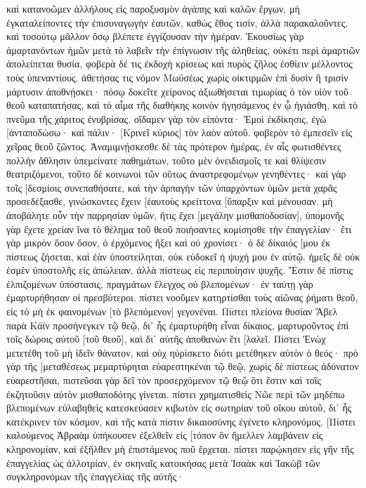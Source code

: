 καὶ κατανοῶμεν ἀλλήλους εἰς παροξυσμὸν ἀγάπης καὶ καλῶν ἔργων, 
μὴ ἐγκαταλείποντες τὴν ἐπισυναγωγὴν ἑαυτῶν, καθὼς ἔθος τισίν, ἀλλὰ παρακαλοῦντες, καὶ τοσούτῳ μᾶλλον ὅσῳ βλέπετε ἐγγίζουσαν τὴν ἡμέραν. 
Ἑκουσίως γὰρ ἁμαρτανόντων ἡμῶν μετὰ τὸ λαβεῖν τὴν ἐπίγνωσιν τῆς ἀληθείας, οὐκέτι περὶ ἁμαρτιῶν ἀπολείπεται θυσία, 
φοβερὰ δέ τις ἐκδοχὴ κρίσεως καὶ πυρὸς ζῆλος ἐσθίειν μέλλοντος τοὺς ὑπεναντίους. 
ἀθετήσας τις νόμον Μωϋσέως χωρὶς οἰκτιρμῶν ἐπὶ δυσὶν ἢ τρισὶν μάρτυσιν ἀποθνῄσκει· 
πόσῳ δοκεῖτε χείρονος ἀξιωθήσεται τιμωρίας ὁ τὸν υἱὸν τοῦ θεοῦ καταπατήσας, καὶ τὸ αἷμα τῆς διαθήκης κοινὸν ἡγησάμενος ἐν ᾧ ἡγιάσθη, καὶ τὸ πνεῦμα τῆς χάριτος ἐνυβρίσας. 
οἴδαμεν γὰρ τὸν εἰπόντα· Ἐμοὶ ἐκδίκησις, ἐγὼ [ἀνταποδώσω· καὶ πάλιν· [Κρινεῖ κύριος] τὸν λαὸν αὐτοῦ. 
φοβερὸν τὸ ἐμπεσεῖν εἰς χεῖρας θεοῦ ζῶντος. 
Ἀναμιμνῄσκεσθε δὲ τὰς πρότερον ἡμέρας, ἐν αἷς φωτισθέντες πολλὴν ἄθλησιν ὑπεμείνατε παθημάτων, 
τοῦτο μὲν ὀνειδισμοῖς τε καὶ θλίψεσιν θεατριζόμενοι, τοῦτο δὲ κοινωνοὶ τῶν οὕτως ἀναστρεφομένων γενηθέντες· 
καὶ γὰρ τοῖς [δεσμίοις συνεπαθήσατε, καὶ τὴν ἁρπαγὴν τῶν ὑπαρχόντων ὑμῶν μετὰ χαρᾶς προσεδέξασθε, γινώσκοντες ἔχειν [ἑαυτοὺς κρείττονα [ὕπαρξιν καὶ μένουσαν. 
μὴ ἀποβάλητε οὖν τὴν παρρησίαν ὑμῶν, ἥτις ἔχει [μεγάλην μισθαποδοσίαν], 
ὑπομονῆς γὰρ ἔχετε χρείαν ἵνα τὸ θέλημα τοῦ θεοῦ ποιήσαντες κομίσησθε τὴν ἐπαγγελίαν· 
ἔτι γὰρ μικρὸν ὅσον ὅσον, ὁ ἐρχόμενος ἥξει καὶ οὐ χρονίσει· 
ὁ δὲ δίκαιός [μου ἐκ πίστεως ζήσεται, καὶ ἐὰν ὑποστείληται, οὐκ εὐδοκεῖ ἡ ψυχή μου ἐν αὐτῷ. 
ἡμεῖς δὲ οὐκ ἐσμὲν ὑποστολῆς εἰς ἀπώλειαν, ἀλλὰ πίστεως εἰς περιποίησιν ψυχῆς. 
Ἔστιν δὲ πίστις ἐλπιζομένων ὑπόστασις, πραγμάτων ἔλεγχος οὐ βλεπομένων· 
ἐν ταύτῃ γὰρ ἐμαρτυρήθησαν οἱ πρεσβύτεροι. 
πίστει νοοῦμεν κατηρτίσθαι τοὺς αἰῶνας ῥήματι θεοῦ, εἰς τὸ μὴ ἐκ φαινομένων [τὸ βλεπόμενον] γεγονέναι. 
Πίστει πλείονα θυσίαν Ἅβελ παρὰ Κάϊν προσήνεγκεν τῷ θεῷ, δι᾽ ἧς ἐμαρτυρήθη εἶναι δίκαιος, μαρτυροῦντος ἐπὶ τοῖς δώροις αὐτοῦ [τοῦ θεοῦ], καὶ δι᾽ αὐτῆς ἀποθανὼν ἔτι [λαλεῖ. 
Πίστει Ἑνὼχ μετετέθη τοῦ μὴ ἰδεῖν θάνατον, καὶ οὐχ ηὑρίσκετο διότι μετέθηκεν αὐτὸν ὁ θεός· πρὸ γὰρ τῆς [μεταθέσεως μεμαρτύρηται εὐαρεστηκέναι τῷ θεῷ, 
χωρὶς δὲ πίστεως ἀδύνατον εὐαρεστῆσαι, πιστεῦσαι γὰρ δεῖ τὸν προσερχόμενον τῷ θεῷ ὅτι ἔστιν καὶ τοῖς ἐκζητοῦσιν αὐτὸν μισθαποδότης γίνεται. 
πίστει χρηματισθεὶς Νῶε περὶ τῶν μηδέπω βλεπομένων εὐλαβηθεὶς κατεσκεύασεν κιβωτὸν εἰς σωτηρίαν τοῦ οἴκου αὐτοῦ, δι᾽ ἧς κατέκρινεν τὸν κόσμον, καὶ τῆς κατὰ πίστιν δικαιοσύνης ἐγένετο κληρονόμος. 
[Πίστει καλούμενος Ἀβραὰμ ὑπήκουσεν ἐξελθεῖν εἰς [τόπον ὃν ἤμελλεν λαμβάνειν εἰς κληρονομίαν, καὶ ἐξῆλθεν μὴ ἐπιστάμενος ποῦ ἔρχεται. 
πίστει παρῴκησεν εἰς γῆν τῆς ἐπαγγελίας ὡς ἀλλοτρίαν, ἐν σκηναῖς κατοικήσας μετὰ Ἰσαὰκ καὶ Ἰακὼβ τῶν συγκληρονόμων τῆς ἐπαγγελίας τῆς αὐτῆς· 
